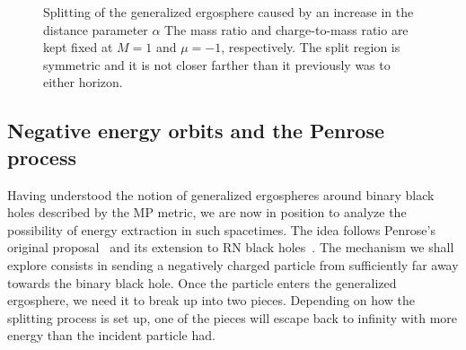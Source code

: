 \begin{figure}[!htbp]
  \centering
  \caption{Splitting of the generalized ergosphere caused by an increase in the distance parameter $\alpha$ The mass ratio and charge-to-mass ratio are kept fixed at $M = 1$ and $\mu = -1$, respectively. The split region is symmetric and it is not closer farther than it previously was to either horizon.}
  \label{ch:penrose_binaries/fig:splitting_ergosphere_distance_increase}
\end{figure}

\subsection{Negative energy orbits and the Penrose process}

Having understood the notion of generalized ergospheres around binary black holes described by the MP metric, we are now in position to analyze the possibility of energy extraction in such spacetimes. The idea follows Penrose's original proposal~\cite{PENROSE1971} and its extension to RN black holes~\cite{RUFFINI1971,DENARDO1973}. The mechanism we shall explore consists in sending a negatively charged particle from sufficiently far away towards the binary black hole.  Once the particle enters the generalized ergosphere, we need it to break up into two pieces. Depending on how the splitting process is set up, one of the pieces will escape back to infinity with more energy than the incident particle had.

